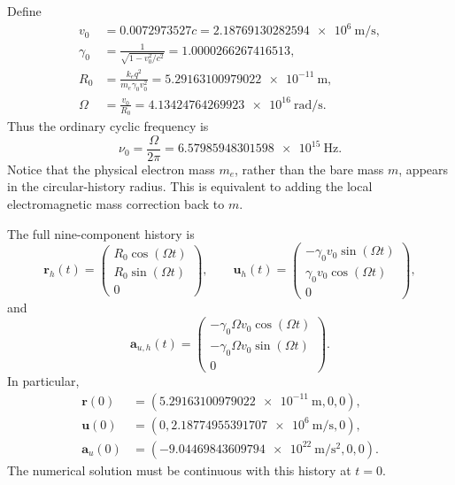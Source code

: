 Define
\begin{align}
  v_0 &= 0.0072973527c
       =\SI{2.18769130282594e6}{\metre\per\second},\\
  \gamma_0 &= \frac{1}{\sqrt{1-v_0^2/c^2}}
       =1.0000266267416513,\\
  R_0 &= \frac{k_eq^2}{m_e\gamma_0v_0^2}
       =\SI{5.29163100979022e-11}{\metre},\\
  \Omega &= \frac{v_0}{R_0}
       =\SI{4.13424764269923e16}{\radian\per\second}.
  \label{eq:history-parameters}
\end{align}
Thus the ordinary cyclic frequency is
\begin{equation}
  \nu_0=\frac{\Omega}{2\pi}
  =\SI{6.57985948301598e15}{\hertz}.
\end{equation}
Notice that the physical electron mass $m_e$, rather than the bare mass $m$,
appears in the circular-history radius.  This is equivalent to adding the
local electromagnetic mass correction back to $m$.

The full nine-component history is
\begin{equation}
  \bm r_h(t)=
  \begin{pmatrix}
    R_0\cos(\Omega t)\\
    R_0\sin(\Omega t)\\
    0
  \end{pmatrix},
  \qquad
  \bm u_h(t)=
  \begin{pmatrix}
    -\gamma_0v_0\sin(\Omega t)\\
     \gamma_0v_0\cos(\Omega t)\\
    0
  \end{pmatrix},
  \label{eq:history-r-u}
\end{equation}
and
\begin{equation}
  \bm a_{u,h}(t)=
  \begin{pmatrix}
    -\gamma_0\Omega v_0\cos(\Omega t)\\
    -\gamma_0\Omega v_0\sin(\Omega t)\\
    0
  \end{pmatrix}.
  \label{eq:history-a}
\end{equation}
In particular,
\begin{align}
  \bm r(0)&=
    (\SI{5.29163100979022e-11}{\metre},0,0),\\
  \bm u(0)&=
    (0,\SI{2.18774955391707e6}{\metre\per\second},0),\\
  \bm a_u(0)&=
    (-\SI{9.04469843609794e22}{\metre\per\second\squared},0,0).
\end{align}
The numerical solution must be continuous with this history at $t=0$.

